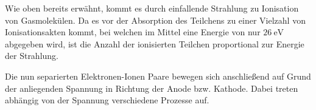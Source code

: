 Wie oben bereits erwähnt, kommt es durch einfallende Strahlung zu Ionisation von Gasmolekülen. Da es vor der Absorption des Teilchens zu einer Vielzahl von Ionisationsakten
kommt, bei welchen im Mittel eine Energie von nur $\qty{26}{\electronvolt}$ abgegeben wird, ist die Anzahl der ionisierten Teilchen proportional zur Energie der Strahlung.

Die nun separierten Elektronen-Ionen Paare bewegen sich anschließend auf Grund der anliegenden Spannung in Richtung der Anode bzw. Kathode. Dabei treten abhängig von der 
Spannung verschiedene Prozesse auf.
